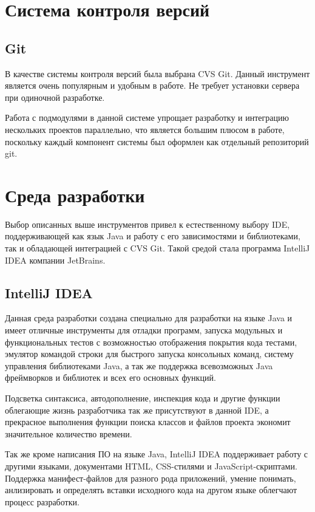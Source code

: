\section{Система контроля версий}
\subsection{Git}

В качестве системы контроля версий была выбрана CVS Git. Данный инструмент является очень популярным и удобным в работе. Не требует установки сервера при одиночной разработке.

Работа с подмодулями в данной системе упрощает разработку и интеграцию нескольких проектов параллельно, что является большим плюсом в работе, поскольку каждый компонент системы был оформлен как отдельный репозиторий git.


\section{Среда разработки}
Выбор описанных выше инструментов привел к естественному выбору IDE, поддерживающей как язык Java и работу с его зависимостями и библиотеками, так и обладающей интеграцией с CVS Git. Такой средой стала программа IntelliJ IDEA компании JetBrains. 
\subsection{IntelliJ IDEA}

Данная среда разработки создана специально для разработки на языке Java и имеет отличные инструменты для отладки программ, запуска модульных и функциональных тестов с возможностью отображения покрытия кода тестами, эмулятор командой строки для быстрого запуска консольных команд, систему управления библиотеками Java, а так же поддержка всевозможных Java фреймворков и библиотек и всех его основных функций. 

Подсветка синтаксиса, автодополнение, инспекция кода и другие функции облегающие жизнь разработчика так же присутствуют в данной IDE, а прекрасное выполнения функции поиска классов и файлов проекта экономит значительное количество времени.

Так же кроме написания ПО на языке Java, IntelliJ IDEA поддерживает работу с другими языками, документами HTML, CSS-стилями и JavaScript-скриптами. Поддержка манифест-файлов для разного рода приложений, умение понимать, анлизировать и определять вставки исходного кода на другом языке облегчают процесс разработки.

